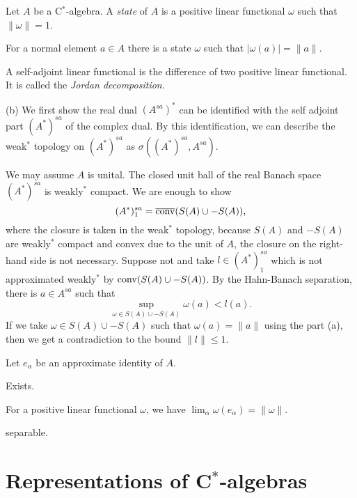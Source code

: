 \documentclass{../../large}
\begin{document}
\begin{prb}
Let $A$ be a C$^*$-algebra.
A \emph{state} of $A$ is a positive linear functional $\omega$ such that $\|\omega\|=1$.
\begin{parts}
\item For a normal element $a\in A$ there is a state $\omega$ such that $|\omega(a)|=\|a\|$.
\item A self-adjoint linear functional is the difference of two positive linear functional. It is called the \emph{Jordan decomposition}.
\end{parts}
\end{prb}
\begin{pf}
(b)
We first show the real dual $(A^{sa})^*$ can be identified with the self adjoint part $(A^*)^{sa}$ of the complex dual.
By this identification, we can describe the weak$^*$ topology on $(A^*)^{sa}$ as $\sigma((A^*)^{sa},A^{sa})$.

We may assume $A$ is unital.
The closed unit ball of the real Banach space $(A^*)^{sa}$ is weakly$^*$ compact.
We are enough to show
\[(A^*)^{sa}_1=\overline{\operatorname{conv}}(S(A)\cup-S(A)),\]
where the closure is taken in the weak$^*$ topology, because $S(A)$ and $-S(A)$ are weakly$^*$ compact and convex due to the unit of $A$, the closure on the right-hand side is not necessary.
Suppose not and take $l\in(A^*)^{sa}_1$ which is not approximated weakly$^*$ by $\operatorname{conv}(S(A)\cup-S(A))$.
By the Hahn-Banach separation, there is $a\in A^{sa}$ such that
\[\sup_{\omega\in S(A)\cup-S(A)}\omega(a)<l(a).\]
If we take $\omega\in S(A)\cup-S(A)$ such that $\omega(a)=\|a\|$ using the part (a), then we get a contradiction to the bound $\|l\|\le1$.


\end{pf}



\begin{prb}
Let $e_\alpha$ be an approximate identity of $A$.
\begin{parts}
\item Exists.
\item For a positive linear functional $\omega$, we have $\lim_\alpha\omega(e_\alpha)=\|\omega\|$.
\item 
\item separable.
\end{parts}
\end{prb}




\section{Representations of C$^*$-algebras}
\end{document}

